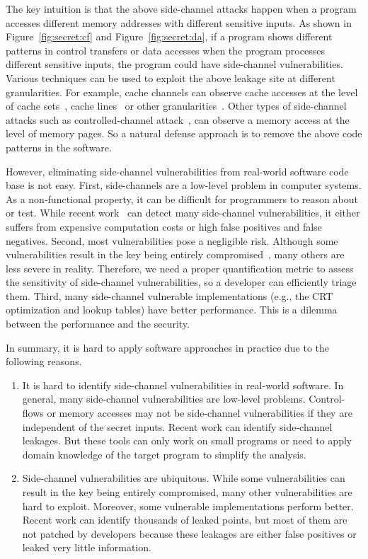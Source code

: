 The key intuition is that the above side-channel attacks happen when a program accesses different memory addresses with different sensitive inputs. As shown in Figure~\ref{fig:secret:cf} and Figure~\ref{fig:secret:da}, if a program shows different patterns in control transfers or data accesses when the program processes different sensitive inputs, the program could have side-channel vulnerabilities. Various techniques can be used to exploit the above leakage site at different granularities. For example, cache channels can observe cache accesses at the level of cache sets~\cite{liu2015last}, cache lines~\cite{184415} or other granularities~\cite{yarom2017cachebleed}. Other types of side-channel attacks such as controlled-channel attack~\cite{7163052}, can observe a memory access at the level of memory pages. So a natural defense approach is to remove the above code patterns in the software.


However, eliminating side-channel vulnerabilities from real-world software code base is not easy. First, side-channels are a low-level problem in computer systems. As a non-functional property, it can be difficult for programmers to reason about or test.  While recent work~\cite{203878,217537,Wichelmann:2018:MFF:3274694.3274741,Brotzman19Casym,236338,182946} can detect many side-channel vulnerabilities, it either suffers from expensive computation costs or high false positives and false negatives.  Second, most vulnerabilities pose a negligible risk. Although some vulnerabilities result in the key being entirely compromised~\cite{184415, aumuller2002fault}, many others are less severe in reality. Therefore, we need a proper quantification metric to assess the sensitivity of side-channel vulnerabilities, so a developer can efficiently triage them.  Third, many side-channel vulnerable implementations (e.g., the CRT optimization and lookup tables) have better performance. This is a dilemma between the performance and the security.


In summary, it is hard to apply software approaches in practice due to the following reasons.

\begin{enumerate}
    \item It is hard to identify side-channel vulnerabilities in real-world software. In general, many side-channel vulnerabilities are low-level problems. Control-flows or memory accesses may not be side-channel vulnerabilities if they are independent of the secret inputs. Recent work can identify side-channel leakages. But these tools can only work on small programs or need to apply domain knowledge of the target program to simplify the analysis.
    \item Side-channel vulnerabilities are ubiquitous. While some vulnerabilities can result in the key being entirely compromised, many other vulnerabilities are hard to exploit. Moreover, some vulnerable implementations perform better. Recent work can identify thousands of leaked points, but most of them are not patched by developers because these leakages are either false positives or leaked very little information.
\end{enumerate}

